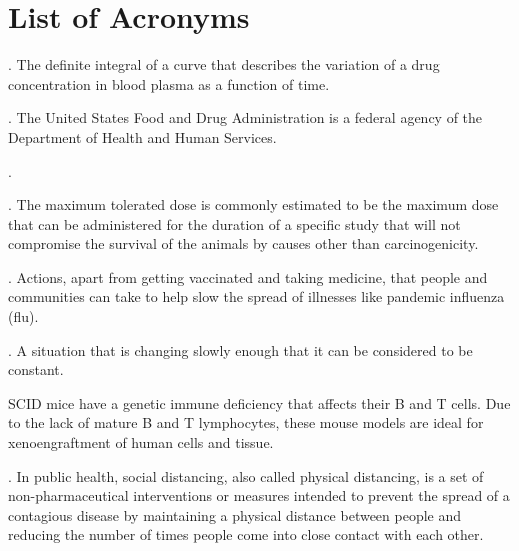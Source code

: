 \chapter*{List of Acronyms}

\begin{acronym}
	.
	The definite integral of a curve that describes the variation of a drug concentration in blood plasma as a function of time.
	
	.
	The United States Food and Drug Administration is a federal agency of the Department of Health and Human Services.
	
	.
	
	.
	The maximum tolerated dose is commonly estimated to be the maximum dose that can be administered for the duration of a specific study that will not compromise the survival of the animals by causes other than carcinogenicity.
	
	.
	Actions, apart from getting vaccinated and taking medicine, that people and communities can take to help slow the spread of illnesses like pandemic influenza (flu).
	
	.
	A situation that is changing slowly enough that it can be considered to be constant.
	
	SCID mice have a genetic immune deficiency that affects their B and T cells. Due to the lack of mature B and T lymphocytes, these mouse models are ideal for xenoengraftment of human cells and tissue.
	
	.
	In public health, social distancing, also called physical distancing, is a set of non-pharmaceutical interventions or measures intended to prevent the spread of a contagious disease by maintaining a physical distance between people and reducing the number of times people come into close contact with each other.
	
	
\end{acronym}
